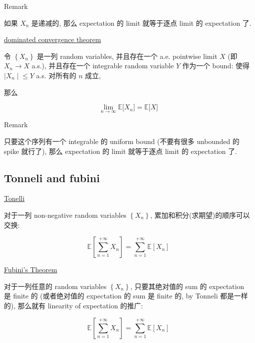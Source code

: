 \documentclass{qlnotes-export}
\begin{document}
\begin{qlremark}{Remark}

如果 \(X_{n}\) 是递减的, 那么 expectation 的 limit 就等于逐点 limit 的 expectation 了.

\end{qlremark}

\begin{theorem}{\href{https://qiulinfan.github.io/notes/math/measure-theory/\#kn-dominated-convergence-theorem}{dominated
convergence theorem}}

令 \(\left\{ X_{n} \right\}\) 是一列 random variables, 并且存在一个 a.e. pointwise limit \(X\) (即 \(X_{n}\rightarrow X\) a.s.), 并且存在一个 integrable random variable \(Y\) 作为一个 bound: 使得 \(\left. |X_{n} \middle| \leq Y \right.\) a.s. 对所有的 \(n\) 成立,

那么

\[\lim\limits_{n\rightarrow\infty}{\mathbb{E}}\lbrack X_{n}\rbrack = {\mathbb{E}}\lbrack X\rbrack\]

\end{theorem}

\begin{qlremark}{Remark}

只要这个序列有一个 integrable 的 uniform bound (不要有很多 unbounded 的 spike 就行了), 那么 expectation 的 limit 就等于逐点 limit 的 expectation 了.

\end{qlremark}

\subsection{Tonneli and fubini}\label{tonneli-and-fubini}

\begin{theorem}{\href{https://qiulinfan.github.io/notes/math/measure-theory/\#kn-tonelli-theorem}{Tonelli}}

对于一列 non-negative random variables \(\left\{ X_{n} \right\}\), 累加和积分(求期望)的顺序可以交换:

\[{\mathbb{E}}\left\lbrack {\sum\limits_{n = 1}^{+ \infty}X_{n}} \right\rbrack = \sum\limits_{n = 1}^{+ \infty}{\mathbb{E}}\left\lbrack X_{n} \right\rbrack\]

\end{theorem}

\begin{theorem}{\href{https://qiulinfan.github.io/notes/math/measure-theory/\#kn-fubini-theorem}{Fubini's
Theorem}}

对于一列任意的 random variables \(\left\{ X_{n} \right\}\), 只要其绝对值的 sum 的 expectation 是 finite 的 (或者绝对值的 expectation 的 sum 是 finite 的, by Tonneli 都是一样的), 那么就有 linearity of expectation 的推广:

\[{\mathbb{E}}\left\lbrack {\sum\limits_{n = 1}^{+ \infty}X_{n}} \right\rbrack = \sum\limits_{n = 1}^{+ \infty}{\mathbb{E}}\left\lbrack X_{n} \right\rbrack\]

\end{theorem}
\end{document}
